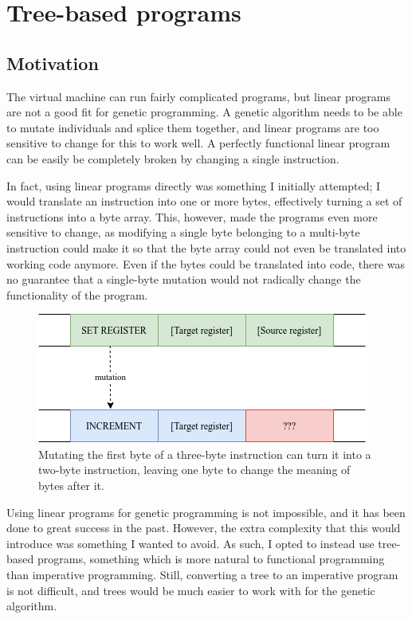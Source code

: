 \documentclass{report}
\begin{document}
\section{Tree-based programs}
\subsection{Motivation}
The virtual machine can run fairly complicated programs, but linear programs are not a good fit for genetic programming. A genetic algorithm needs to be able to mutate individuals and splice them together, and linear programs are too sensitive to change for this to work well. A perfectly functional linear program can be easily be completely broken by changing a single instruction.

In fact, using linear programs directly was something I initially attempted; I would translate an instruction into one or more bytes, effectively turning a set of instructions into a byte array. This, however, made the programs even more sensitive to change, as modifying a single byte belonging to a multi-byte instruction could make it so that the byte array could not even be translated into working code anymore. Even if the bytes could be translated into code, there was no guarantee that a single-byte mutation would not radically change the functionality of the program.

\begin{figure}[H]
    \centering
    \includegraphics[scale=0.75]{binary_mutation}
    \caption{Mutating the first byte of a three-byte instruction can turn it into a two-byte instruction, leaving one byte to change the meaning of bytes after it.}
\end{figure}

Using linear programs for genetic programming is not impossible, and it has been done to great success in the past. However, the extra complexity that this would introduce was something I wanted to avoid. As such, I opted to instead use tree-based programs, something which is more natural to functional programming than imperative programming. Still, converting a tree to an imperative program is not difficult, and trees would be much easier to work with for the genetic algorithm.
\end{document}
